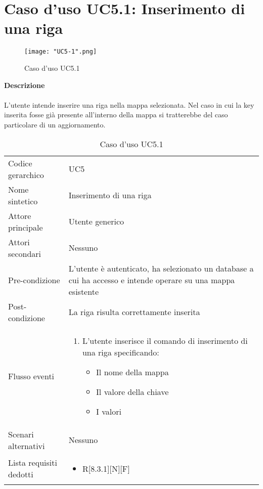 \documentclass[a4paper]{report}
\begin{document}
	 \section{Caso d'uso UC5.1: Inserimento di una riga}
	 \begin{figure}[H]
			\centering
			\texttt{[image: "UC5-1".png]}
			\caption{Caso d'uso UC5.1}
		\end{figure}
	 \textbf{Descrizione} \\ \\
	 L'utente intende inserire una riga nella mappa selezionata. Nel caso in cui la key inserita
	 fosse già presente all'interno della mappa si tratterebbe del caso particolare di un aggiornamento.
		\begin{table}[H]
		\begin{tabularx}{\textwidth}{X | X}\toprule
			\rowcolor{orange!65}Codice gerarchico & UC5\\
			Nome sintetico & Inserimento di una riga\\
			\rowcolor{orange!65}Attore principale & Utente generico\\
			Attori secondari & Nessuno \\
			\rowcolor{orange!65}Pre-condizione & L'utente è autenticato, ha selezionato un database a cui ha 
			accesso e intende operare su una mappa esistente \\
			Post-condizione & La riga risulta correttamente inserita\\
			\rowcolor{orange!65}Flusso eventi & \begin{enumerate}
			\item L'utente inserisce il comando di inserimento di una riga specificando:
			\begin{itemize}
				\item Il nome della mappa
				\item Il valore della chiave
				\item I valori
			\end{itemize}
			\end{enumerate} \\
			Scenari alternativi & Nessuno \\
			\rowcolor{orange!65}Lista requisiti dedotti & \begin{itemize}
				\item R[8.3.1][N][F]
				\end{itemize} \\
			\bottomrule
		\end{tabularx}
		\caption{Caso d'uso UC5.1}
	 \end{table}
\end{document}
